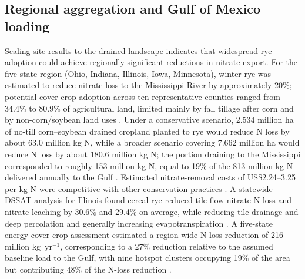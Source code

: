 \documentclass[11pt]{article}
\begin{document}
\subsection{Regional aggregation and Gulf of Mexico loading}
Scaling site results to the drained landscape indicates that widespread rye adoption could achieve regionally significant reductions in nitrate export. For the five-state region (Ohio, Indiana, Illinois, Iowa, Minnesota), winter rye was estimated to reduce nitrate loss to the Mississippi River by approximately 20\%; potential cover-crop adoption across ten representative counties ranged from 34.4\% to 80.9\% of agricultural land, limited mainly by fall tillage after corn and by non-corn/soybean land uses \parencite{Kladivko2014}. Under a conservative scenario, 2.534 million ha of no-till corn--soybean drained cropland planted to rye would reduce N loss by about 63.0 million kg N, while a broader scenario covering 7.662 million ha would reduce N loss by about 180.6 million kg N; the portion draining to the Mississippi corresponded to roughly 153 million kg N, equal to 19\% of the 813 million kg N delivered annually to the Gulf \parencite{Kladivko2014}. Estimated nitrate-removal costs of US\$2.24--3.25 per kg N were competitive with other conservation practices \parencite{Kladivko2014}. A statewide DSSAT analysis for Illinois found cereal rye reduced tile-flow nitrate-N loss and nitrate leaching by 30.6\% and 29.4\% on average, while reducing tile drainage and deep percolation and generally increasing evapotranspiration \parencite{Gupta2023b}. A five-state energy-cover-crop assessment estimated a region-wide N-loss reduction of 216 million kg~yr$^{-1}$, corresponding to a 27\% reduction relative to the assumed baseline load to the Gulf, with nine hotspot clusters occupying 19\% of the area but contributing 48\% of the N-loss reduction \parencite{Malone2023}.
\end{document}
